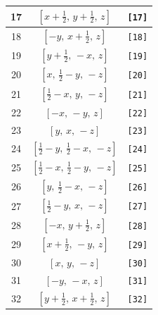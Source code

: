 \documentclass[fleqn,8pt]{jsarticle}
\begin{document}
\begin{longtable}{ccc}
17 & $\left[ x + \frac{1}{2},\, y + \frac{1}{2},\, z \right]$ & {\tt [17]} \\ \hline
18 & $\left[ - y,\, x + \frac{1}{2},\, z \right]$ & {\tt [18]} \\ \hline
19 & $\left[ y + \frac{1}{2},\, - x,\, z \right]$ & {\tt [19]} \\ \hline
20 & $\left[ x,\, \frac{1}{2} - y,\, - z \right]$ & {\tt [20]} \\ \hline
21 & $\left[ \frac{1}{2} - x,\, y,\, - z \right]$ & {\tt [21]} \\ \hline
22 & $\left[ - x,\, - y,\, z \right]$ & {\tt [22]} \\ \hline
23 & $\left[ y,\, x,\, - z \right]$ & {\tt [23]} \\ \hline
24 & $\left[ \frac{1}{2} - y,\, \frac{1}{2} - x,\, - z \right]$ & {\tt [24]} \\ \hline
25 & $\left[ \frac{1}{2} - x,\, \frac{1}{2} - y,\, - z \right]$ & {\tt [25]} \\ \hline
26 & $\left[ y,\, \frac{1}{2} - x,\, - z \right]$ & {\tt [26]} \\ \hline
27 & $\left[ \frac{1}{2} - y,\, x,\, - z \right]$ & {\tt [27]} \\ \hline
28 & $\left[ - x,\, y + \frac{1}{2},\, z \right]$ & {\tt [28]} \\ \hline
29 & $\left[ x + \frac{1}{2},\, - y,\, z \right]$ & {\tt [29]} \\ \hline
30 & $\left[ x,\, y,\, - z \right]$ & {\tt [30]} \\ \hline
31 & $\left[ - y,\, - x,\, z \right]$ & {\tt [31]} \\ \hline
32 & $\left[ y + \frac{1}{2},\, x + \frac{1}{2},\, z \right]$ & {\tt [32]} \\
\end{longtable}
\end{document}

